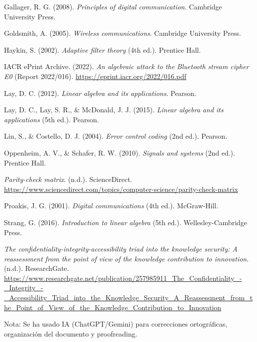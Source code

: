\documentclass[letterpaper,12pt]{article}
\begin{document}
Gallager, R. G. (2008). \textit{Principles of digital communication}. Cambridge University Press.

Goldsmith, A. (2005). \textit{Wireless communications}. Cambridge University Press.

Haykin, S. (2002). \textit{Adaptive filter theory} (4th ed.). Prentice Hall.

IACR ePrint Archive. (2022). \textit{An algebraic attack to the Bluetooth stream cipher E0} (Report 2022/016). \url{https://eprint.iacr.org/2022/016.pdf}

Lay, D. C. (2012). \textit{Linear algebra and its applications}. Pearson.

Lay, D. C., Lay, S. R., \& McDonald, J. J. (2015). \textit{Linear algebra and its applications} (5th ed.). Pearson.

Lin, S., \& Costello, D. J. (2004). \textit{Error control coding} (2nd ed.). Pearson.

Oppenheim, A. V., \& Schafer, R. W. (2010). \textit{Signals and systems} (2nd ed.). Prentice Hall.

\textit{Parity-check matrix}. (n.d.). ScienceDirect. \url{https://www.sciencedirect.com/topics/computer-science/parity-check-matrix}

Proakis, J. G. (2001). \textit{Digital communications} (4th ed.). McGraw-Hill.

Strang, G. (2016). \textit{Introduction to linear algebra} (5th ed.). Wellesley-Cambridge Press.

\textit{The confidentiality-integrity-accessibility triad into the knowledge security: A reassessment from the point of view of the knowledge contribution to innovation}. (n.d.). ResearchGate. \url{https://www.researchgate.net/publication/257985911_The_Confidentiality_-_Integrity_-_Accessibility_Triad_into_the_Knowledge_Security_A_Reassessment_from_the_Point_of_View_of_the_Knowledge_Contribution_to_Innovation}

Nota: Se ha usado IA (ChatGPT/Gemini) para correcciones ortográficas, organización del documento y proofreading.




\newpage
\endgroup
\end{document}
